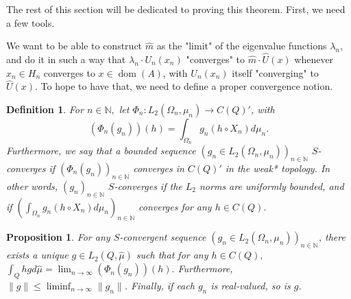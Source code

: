 \documentclass[10pt,a4paper]{amsart}
\newtheorem{prop}[thm]{Proposition}
\newtheorem{definition}[thm]{Definition}
\def \Dom{\operatorname{dom}}
\def \HMU{\hat{\mu}}
\def \HU{\hat{U}}
\def \Hm{\hat{m}}
\begin{document}
The rest of this section will be dedicated to proving this theorem. First, we need a few tools. 



We want to be able to construct $\Hm$ as the "limit" of the eigenvalue functions $\lambda_n$, and do it in such a way that $\lambda_n\cdot U_n(x_n)$ "converges" to $\Hm\cdot\HU(x)$ whenever $x_n\in H_n$ converges to $x\in\Dom(A)$, with $U_n(x_n)$ itself "converging" to $\HU(x).$ To hope to have that, we need to define a proper convergence notion. 


\begin{definition}\label{definition_L2_limit}
	For $n\in\mathbb{N},$ let $\Phi_n:L_2(\Omega_n,\mu_n)\rightarrow C(Q)'$, with $$(\Phi_n(g_n))(h)=\int_{\Omega_n} g_n(h\circ X_n)d\mu_n.$$ Furthermore, we say that a bounded sequence $(g_n\in L_2(\Omega_n,\mu_n))_{n\in\mathbb{N}}$ $S$-converges if $(\Phi_n(g_n))_{n\in\mathbb{N}}$ converges in $C(Q)'$ in the weak* topology. In other words,  $(g_n)_{n\in\mathbb{N}}$ $S$-converges if the $L_2$ norms are uniformly bounded, and if $\left(\int_{\Omega_n}g_n(h\circ X_n)d\mu_n\right)_{n\in\mathbb{N}}$ converges for any $h\in C(Q).$
\end{definition}
\begin{prop}\label{proposition_L2_limit}
	For any $S$-convergent sequence $(g_n\in L_2(\Omega_n,\mu_n))_{n\in\mathbb{N}}$, there exists a unique $g\in L_2(Q,\HMU)$ such that for any $h\in C(Q),$ $\int_{Q}hgd\HMU=\lim_{n\rightarrow\infty}(\Phi_n(g_n))(h).$ Furthermore, $\|g\|\leq\liminf_{n\rightarrow\infty}\|g_n\|$. Finally, if each $g_n$ is real-valued, so is $g$.
\end{prop}
\end{document}
